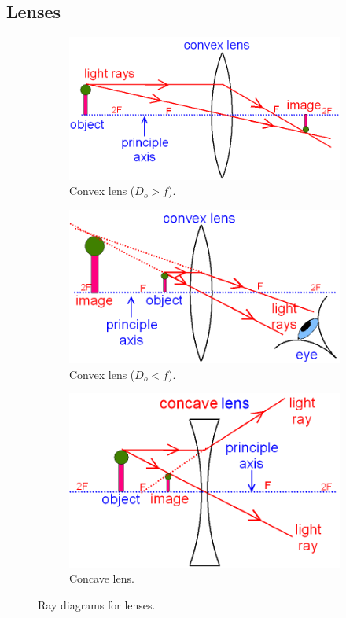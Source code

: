 \documentclass[a4paper]{amsbook}
\newcommand\capcite[1]{}
\begin{document}
\subsection{Lenses}
\begin{figure}
  \centering
  \begin{subfigure}[t]{0.5\textwidth}
    \centering
    \includegraphics[width=.8\linewidth]{lense1}
    \caption{Convex lens ($D_o > f $).\\ \tiny{\capcite{http://www.gcsescience.com/convex-lens-image-real-inverted-smaller.gif}}\label{fig:lens1}}
  \end{subfigure}%
  \begin{subfigure}[t]{0.5\textwidth}
    \centering
    \includegraphics[width=.8\linewidth]{lense2}
    \caption{Convex lens ($D_o < f $).\\ \tiny{\capcite{http://www.gcsescience.com/convex-lens-magnifying-glass.gif}}\label{fig:lens2}}
  \end{subfigure}
  \begin{subfigure}[t]{0.5\textwidth}
    \centering
    \includegraphics[width=.8\linewidth]{lense3}
    \caption{Concave lens.\\ \tiny{\capcite{http://www.gcsescience.com/concave-lens-ray-diagram-divergent.gif}}\label{fig:lens3}}
  \end{subfigure}
  \caption{Ray diagrams for lenses.\label{fig:lenses}}
\end{figure}
\end{document}
